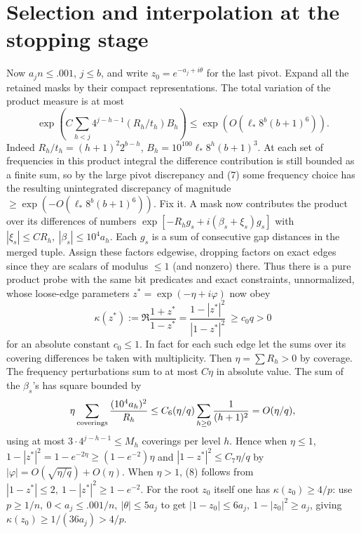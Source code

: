 \documentclass[11pt]{article}
\begin{document}
\section*{Selection and interpolation at the stopping stage} Now \(a_j n\le .001\), \(j\le b\), and write \(z_0=e^{-a_j+i\theta}\) for the last pivot. Expand all the retained masks by their compact representations. The total variation of the product measure is at most
\[
 \exp(C\sum_{h<j} 4^{j-h-1}(R_h/t_h) B_h)
 \le \exp(O(\ell_*8^b(b+1)^6)).
 \tag{7}
\]
Indeed \(R_h/t_h=(h+1)^2 2^{b-h}\), \(B_h=10^{100}\ell_*8^h(b+1)^3\). At each set of frequencies in this product integral the difference contribution is still bounded as a finite sum, so by the large pivot discrepancy and (7) some frequency choice has the resulting unintegrated discrepancy of magnitude \(\ge \exp(-O(\ell_*8^b(b+1)^6))\). Fix it. A mask now contributes the product over its differences of numbers
\(\exp[-R_h g_s+i(\beta_s+\xi_s)g_s]\) with \(|\xi_s|\le C R_h,\ |\beta_s|\le10^4 a_h\). Each \(g_s\) is a sum of consecutive gap distances in the merged tuple. Assign these factors edgewise, dropping factors on exact edges since they are scalars of modulus \(\le1\) (and nonzero) there. Thus there is a pure product probe with the same bit predicates and exact constraints, unnormalized, whose loose-edge parameters \(z^*=\exp(-\eta+i\varphi)\) now obey
\[
 \kappa(z^*):=\Re\frac{1+z^*}{1-z^*}=\frac{1-|z^*|^2}{|1-z^*|^2}\ \ge c_0 q>0
 \tag{8}
\]
for an absolute constant \(c_0\le1\). In fact for each such edge let the sums over its covering differences be taken with multiplicity. Then \(\eta=\sum R_h>0\) by coverage. The frequency perturbations sum to at most \(C\eta\) in absolute value. The sum of the \(\beta_s\)'s has square bounded by
\[
 \eta\sum_{\rm coverings}\frac{(10^4 a_h)^2}{R_h}
 \le C_6(\eta/q)\sum_{h\ge0}\frac{1}{(h+1)^2} = O(\eta/q),
\]
using at most \(3\cdot4^{j-h-1}\le M_h\) coverings per level \(h\). Hence when \(\eta\le1\), \(1-|z^*|^2=1-e^{-2\eta}\ge(1-e^{-2})\eta\) and \(|1-z^*|^2\le C_7\eta/q\) by \(|\varphi|=O(\sqrt{\eta/q})+O(\eta)\). When \(\eta>1\), (8) follows from \(|1-z^*|\le2,\ 1-|z^*|^2\ge1-e^{-2}\). For the root \(z_0\) itself one has \(\kappa(z_0)\ge 4/p\): use \(p\ge1/n,\ 0<a_j\le.001/n,\ |\theta|\le5 a_j\) to get \(|1-z_0|\le6a_j,\ 1-|z_0|^2\ge a_j\), giving \(\kappa(z_0)\ge1/(36a_j)>4/p\).
\end{document}
